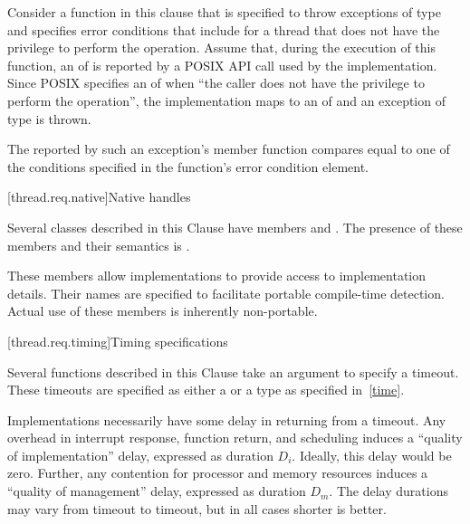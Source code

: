 \begin{example}
Consider a function in this clause that is specified to throw exceptions of type
 and specifies error conditions that include
 for a thread that does not have the privilege to
perform the operation. Assume that, during the execution of this function, an 
of  is reported by a POSIX API call used by the implementation. Since POSIX
specifies an  of  when ``the caller does not have the privilege
to perform the operation'', the implementation maps  to an
 of  and an exception
of type  is thrown.
\end{example}

\pnum
The  reported by such an exception's  member function
compares equal to one of the conditions specified in the function's error condition
element.

[thread.req.native]{Native handles}

\pnum
Several classes described in this Clause have members  and
. The presence of these members and their semantics is
.
\begin{note}
These members allow implementations to provide access
to implementation details. Their names are specified to facilitate portable compile-time
detection. Actual use of these members is inherently non-portable.
\end{note}

[thread.req.timing]{Timing specifications}

\pnum
Several functions described in this Clause take an argument to specify a timeout. These
timeouts are specified as either a  or a  type as
specified in~\ref{time}.

\pnum
Implementations necessarily have some delay in returning from a timeout. Any overhead in
interrupt response, function return, and scheduling induces a ``quality of implementation''
delay, expressed as duration $D_i$. Ideally, this delay would be zero. Further, any contention for
processor and memory resources induces a ``quality of management'' delay, expressed as duration
$D_m$. The delay durations may vary from timeout to timeout, but in all cases shorter is better.

